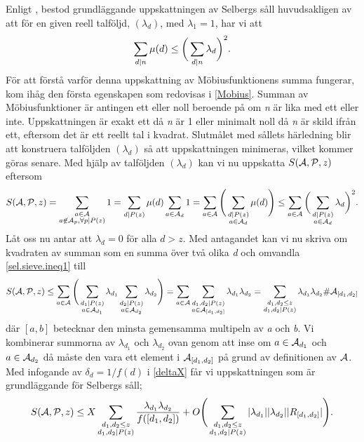 Enligt \cite{cojocarumurty}, bestod grundläggande uppskattningen av Selbergs såll huvudsakligen av att för en given reell talföljd, \((\lambda_d)\), med \(\lambda_1 = 1\), har vi att 
\begin{equation}
    \sum_{d\divides n}\mu(d) \leq \bigg(\sum_{d\divides n}\lambda_d\bigg)^2.\nonumber
\end{equation}
För att förstå varför denna uppskattning av Möbiusfunktionens summa fungerar, kom ihåg den första egenskapen som redovisas i \ref{Mobius}. 
Summan av Möbiusfunktioner är antingen ett eller noll beroende på om \textit{n} är lika med ett eller inte.
Uppskattningen är exakt ett då \textit{n} är 1 eller minimalt noll då \textit{n} är skild ifrån ett, eftersom det är ett reellt tal i kvadrat.
Slutmålet med sållets härledning blir att konstruera talföljden \((\lambda_d)\) så att uppskattningen minimeras, vilket kommer göras senare.
Med hjälp av talföljden \((\lambda_d)\) kan vi nu uppskatta \(\S{A}{P}{z}\) eftersom
\begin{equation}
\S{A}{P}{z} = \sum_{\substack{a\in \mathcal{A}\\a\not\in\mathcal{A}_p,\forall p\divides P(z)}} 1 = \sum_{d\divides P(z)} \mu(d) \sum_{a\in\mathcal{A}_d}1 = \sum_{a\in \A} \Bigg(\sum_{\substack{d\divides P(z)\\a\in \A_d}}\mu(d)\Bigg)\leq \sum_{a\in \A}\bigg(\sum_{\substack{d\divides P(z)\\a\in \A_d}}\lambda_d\bigg)^2.\label{sel.sieve.ineq1}
\end{equation}
Låt oss nu antar att \(\lambda_d = 0\) för alla \(d > z\). Med antagandet kan vi nu skriva om kvadraten av summan som en summa över två olika \textit{d} och omvandla \eqref{sel.sieve.ineq1} till
\begin{equation}
    \S{A}{P}{z} \leq \sum_{a\in \A}\Bigg(\sum_{\substack{d_1\divides P(z)\\a\in \A_{d_1}}}\lambda_{d_1}\sum_{\substack{d_2\divides P(z)\\a\in \A_{d_2}}}\lambda_{d_2}\Bigg)  =  \sum_{a\in \A}\sum_{\substack{d_1,d_2\divides P(z)\\a\in \A_{[d_1,d_2]}}}\lambda_{d_1}\lambda_{d_2} = \sum_{\substack{d_1,d_2\leq z\\d_1,d_2\divides P(z)}}\lambda_{d_1}\lambda_{d_2}\#\A_{[d_1, d_2]}\nonumber
\end{equation}
där \([a, b]\) betecknar den minsta gemensamma multipeln av \textit{a} och \textit{b}. 
Vi kombinerar summorna av \(\lambda_{d_1}\) och \(\lambda_{d_2}\) ovan genom att inse om \(a\in\A_{d_1}\) och \(a\in\A_{d_2}\) då måste den vara ett element i \(\A_{[d_1,d_2]}\) på grund av definitionen av \(\A\).
Med infogande av \(\delta_d = 1/f(d)\) i \eqref{deltaX} får vi uppskattningen som är grundläggande för Selbergs såll;
\begin{equation}
    \S{A}{P}{z} \leq X\sum_{\substack{d_1,d_2\leq z\\d_1,d_2\divides P(z)}}\frac{\lambda_{d_1}\lambda_{d_2}}{f([d_1,d_2])} + O\Bigg(\sum_{\substack{d_1,d_2\leq z\\d_1,d_2\divides P(z)}}|\lambda_{d_1}||\lambda_{d_2}||R_{[d_1, d_2]}|\Bigg)\label{sel.sieve.main}.
\end{equation}

